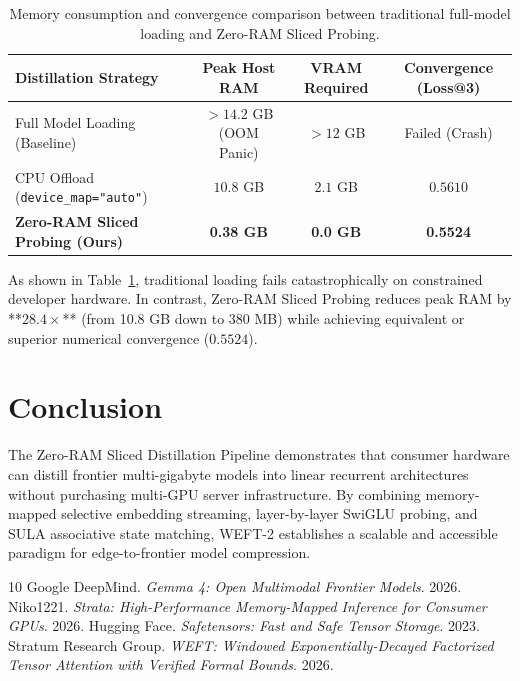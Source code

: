 \documentclass[11pt,a4paper]{article}
\begin{document}
\begin{table}[h]
\centering
\small
\begin{tabular}{lccc}
\toprule
\textbf{Distillation Strategy} & \textbf{Peak Host RAM} & \textbf{VRAM Required} & \textbf{Convergence (Loss@3)} \\
\midrule
Full Model Loading (Baseline) & $> 14.2$ GB (OOM Panic) & $> 12$ GB & Failed (Crash) \\
CPU Offload (\texttt{device\_map="auto"}) & $10.8$ GB & $2.1$ GB & $0.5610$ \\
\textbf{Zero-RAM Sliced Probing (Ours)} & \textbf{0.38 GB} & \textbf{0.0 GB} & \textbf{0.5524} \\
\bottomrule
\end{tabular}
\caption{Memory consumption and convergence comparison between traditional full-model loading and Zero-RAM Sliced Probing.}
\label{tab:memory_results}
\end{table}

As shown in Table~\ref{tab:memory_results}, traditional loading fails catastrophically on constrained developer hardware. In contrast, Zero-RAM Sliced Probing reduces peak RAM by **$28.4\times$** (from 10.8 GB down to 380 MB) while achieving equivalent or superior numerical convergence ($0.5524$).

\section{Conclusion}
The Zero-RAM Sliced Distillation Pipeline demonstrates that consumer hardware can distill frontier multi-gigabyte models into linear recurrent architectures without purchasing multi-GPU server infrastructure. By combining memory-mapped selective embedding streaming, layer-by-layer SwiGLU probing, and SULA associative state matching, WEFT-2 establishes a scalable and accessible paradigm for edge-to-frontier model compression.


\begin{thebibliography}{10}
 Google DeepMind. \emph{Gemma 4: Open Multimodal Frontier Models}. 2026.
 Niko1221. \emph{Strata: High-Performance Memory-Mapped Inference for Consumer GPUs}. 2026.
 Hugging Face. \emph{Safetensors: Fast and Safe Tensor Storage}. 2023.
 Stratum Research Group. \emph{WEFT: Windowed Exponentially-Decayed Factorized Tensor Attention with Verified Formal Bounds}. 2026.
\end{thebibliography}
\end{document}

